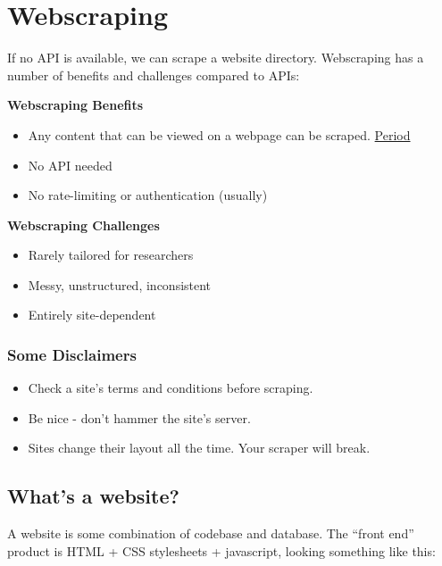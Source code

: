 \documentclass[]{book}
\providecommand{\tightlist}{%
  \setlength{\itemsep}{0pt}\setlength{\parskip}{0pt}}
\begin{document}
\hypertarget{webscraping}{\section{Webscraping}\label{webscraping}}

If no API is available, we can scrape a website directory. Webscraping
has a number of benefits and challenges compared to APIs:

\textbf{Webscraping Benefits}

\begin{itemize}
\tightlist
\item
  Any content that can be viewed on a webpage can be scraped.
  \href{https://blog.hartleybrody.com/web-scraping/}{Period}
\item
  No API needed
\item
  No rate-limiting or authentication (usually)
\end{itemize}

\textbf{Webscraping Challenges}

\begin{itemize}
\tightlist
\item
  Rarely tailored for researchers
\item
  Messy, unstructured, inconsistent
\item
  Entirely site-dependent
\end{itemize}

\subsubsection*{Some Disclaimers}\label{some-disclaimers}

\begin{itemize}
\tightlist
\item
  Check a site's terms and conditions before scraping.
\item
  Be nice - don't hammer the site's server.
\item
  Sites change their layout all the time. Your scraper will break.
\end{itemize}

\subsection{What's a website?}\label{whats-a-website}

A website is some combination of codebase and database. The ``front
end'' product is HTML + CSS stylesheets + javascript, looking something
like this:
\end{document}
